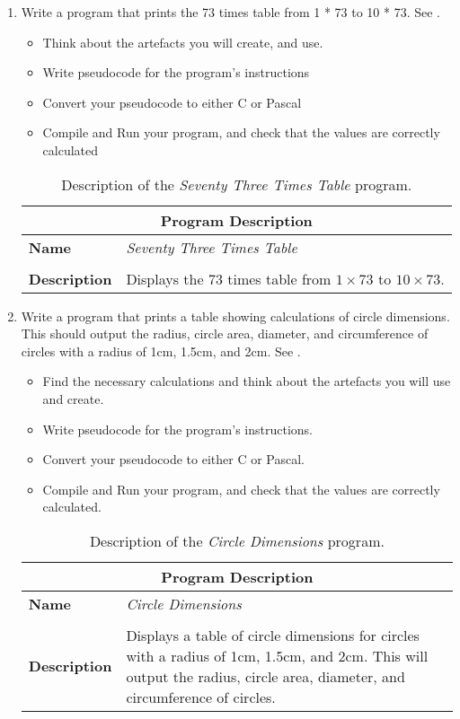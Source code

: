 \begin{enumerate}
  
  \item Write a program that prints the 73 times table from 1 * 73 to 10 * 73. See .
  \begin{itemize}
    \item Think about the artefacts you will create, and use.
    \item Write pseudocode for the program's instructions
    \item Convert your pseudocode to either C or Pascal
    \item Compile and Run your program, and check that the values are correctly calculated
  \end{itemize}
  
  \begin{table}[h]
  \centering
  \begin{tabular}{l|p{12cm}}
    \hline
    \multicolumn{2}{c}{\textbf{Program Description}} \\
    \hline
    \textbf{Name} & \emph{Seventy Three Times Table} \\
    \\
    \textbf{Description} & Displays the 73 times table from $1 \times 73$ to $10 \times 73$. \\
    \hline
  \end{tabular}
  \caption{Description of the \emph{Seventy Three Times Table} program.}
  \label{tbl:sevelty-three-times}
  \end{table}
  
  \clearpage
  \item Write a program that prints a table showing calculations of circle dimensions. This should output the radius, circle area, diameter, and circumference of circles with a radius of 1cm, 1.5cm, and 2cm. See .
  \begin{itemize}
    \item Find the necessary calculations and think about the artefacts you will use and create.
    \item Write pseudocode for the program's instructions.
    \item Convert your pseudocode to either C or Pascal.
    \item Compile and Run your program, and check that the values are correctly calculated.
  \end{itemize}
  
  \begin{table}[h]
  \centering
  \begin{tabular}{l|p{12cm}}
    \hline
    \multicolumn{2}{c}{\textbf{Program Description}} \\
    \hline
    \textbf{Name} & \emph{Circle Dimensions} \\
    \\
    \textbf{Description} & Displays a table of circle dimensions for circles with a radius of 1cm, 1.5cm, and 2cm. This will output the radius, circle area, diameter, and circumference of circles. \\
    \hline
  \end{tabular}
  \caption{Description of the \emph{Circle Dimensions} program.}
  \label{tbl:circle-dimensions}
  \end{table}
  

\end{enumerate}
